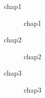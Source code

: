 
\begin{description}
  \item[chap1] chap1
  \item[chap2] chap2
  \item[chap3] chap3
\end{description}

